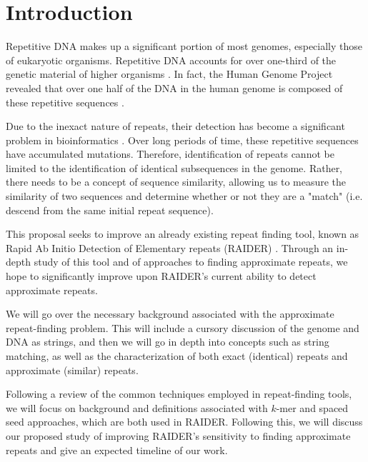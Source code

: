 \chapter{Introduction}
\label{intro}
Repetitive DNA makes up a significant portion of most genomes, especially those of eukaryotic organisms. Repetitive DNA accounts for over one-third of the genetic material of higher organisms \cite{britten1968repeated}. In fact, the Human Genome Project revealed that over one half of the DNA in the human genome is composed of these repetitive sequences \cite{lander2001initial}.

Due to the inexact nature of repeats, their detection has become a significant problem in bioinformatics \cite{figueroa2013raider}. Over long periods of time, these repetitive sequences have accumulated mutations. Therefore, identification of repeats cannot be limited to the identification of identical subsequences in the genome. Rather, there needs to be a concept of sequence similarity, allowing us to measure the similarity of two sequences and determine whether or not they are a "match" (i.e. descend from the same initial repeat sequence).

This proposal seeks to improve an already existing repeat finding tool, known as Rapid Ab Initio Detection of Elementary repeats (RAIDER) \cite{figueroa2013raider}. Through an in-depth study of this tool and of approaches to finding approximate repeats, we hope to significantly improve upon RAIDER's current ability to detect approximate repeats.

We will go over the necessary background associated with the approximate repeat-finding problem. This will include a cursory discussion of the genome and DNA as strings, and then we will go in depth into concepts such as string matching, as well as the characterization of both exact (identical) repeats and approximate (similar) repeats. 

Following a review of the common techniques employed in repeat-finding tools, we will focus on background and definitions associated with $k$-mer and spaced seed approaches, which are both used in RAIDER. Following this, we will discuss our proposed study of improving RAIDER's sensitivity to finding approximate repeats and give an expected timeline of our work.

\clearpage